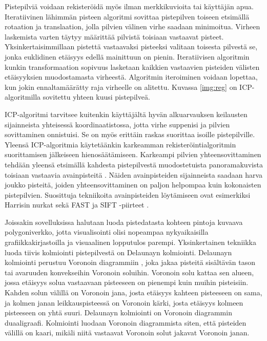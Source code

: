 Pistepilviä voidaan rekisteröidä myös ilman merkkikuvioita tai käyttäjän apua. Iteratiivinen lähimmän pisteen algoritmi  sovittaa pistepilven toiseen etsimällä rotaation ja translaation, jolla pilvien välinen virhe saadaan minimoitua. Virheen laskemista varten täytyy määrittää pilvistä toisiaan vastaavat pisteet. Yksinkertaisimmillaan pistettä vastaavaksi pisteeksi valitaan toisesta pilvestä se, jonka euklidinen etäisyys edellä mainittuun on pienin. Iteratiivisen algoritmin kunkin transformaation sopivuus lasketaan kaikkien vastaavien pisteiden välisten etäisyyksien muodostamasta virheestä. Algoritmin iteroiminen voidaan lopettaa, kun jokin ennaltamäärätty raja virheelle on alitettu. Kuvassa \ref{img:reg} on ICP-algoritmilla sovitettu yhteen kuusi pistepilveä. \cite{icp}


ICP-algoritmi tarvitsee kuitenkin käyttäjältä hyvän alkuarvauksen keilausten sijainneista yhteisessä koordinaatistossa, jotta virhe suppenisi ja pilvien sovittaminen onnistuisi. Se on myös erittäin raskas suorittaa isoille pistepilville. Yleensä ICP-algoritmia käytetäänkin karkeamman rekisteröintialgoritmin suorittamisen jälkeiseen hienosäätämiseen. Karkeampi pilvien yhteensovittaminen tehdään yleensä etsimällä kahdesta pistepilvestä muodostetuista panoramakuvista toisiaan vastaavia avainpisteitä . Näiden avainpisteiden sijainneista saadaan harva joukko pisteitä, joiden yhteensovittaminen on paljon helpompaa kuin kokonaisten pistepilvien. Suosittuja tekniikoita avainpisteiden löytämiseen ovat esimerkiksi Harrisin nurkat \cite{harris} sekä FAST ja SIFT -piirteet \cite{fast}\cite{sift}. \cite{weinmann}

Joissakin sovelluksissa halutaan luoda pistedatasta kohteen pintoja kuvaava polygoniverkko, jotta visualisointi olisi nopeampaa nykyaikaisilla grafiikkakirjastoilla ja visuaalinen lopputulos parempi. Yksinkertainen tekniikka luoda tiivis kolmiointi pistepilvestä on Delaunayn kolmiointi. Delaunayn kolmiointi perustuu Voronoin diagrammiin , joka jakaa pisteitä sisältävän tason tai avaruuden konvekseihin Voronoin soluihin. Voronoin solu kattaa sen alueen, jossa etäisyys solua vastaavaan pisteeseen on pienempi kuin muihin pisteisiin. Kahden solun välillä on Voronoin jana, josta etäisyys kahteen pisteeseen on sama, ja kolmen janan leikkauspisteessä on Voronoin kärki, josta etäisyys kolmeen pisteeseen on yhtä suuri. Delaunayn kolmiointi on Voronoin diagrammin duaaligraafi. Kolmiointi luodaan Voronoin diagrammista siten, että pisteiden välillä on kaari, mikäli niitä vastaavat Voronoin solut jakavat Voronoin janan. \cite{delaunay}

